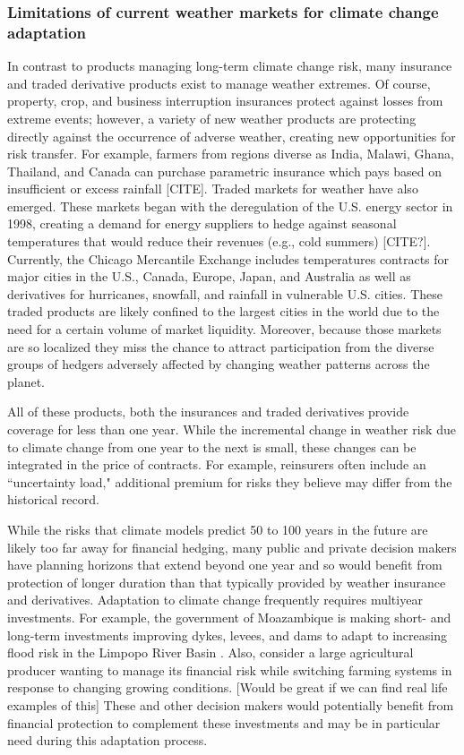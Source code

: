 \documentclass[authoryear]{article}
\begin{document}
\subsubsection{Limitations of current weather markets for climate change adaptation}
In contrast to products managing long-term climate change risk, many insurance and traded derivative products exist to manage weather extremes. Of course, property, crop, and business interruption insurances protect against losses from extreme events; however, a variety of new weather products are protecting directly against the occurrence of adverse weather, creating new opportunities for risk transfer. For example, farmers from regions diverse as India, Malawi, Ghana, Thailand, and Canada can purchase parametric insurance which pays based on insufficient or excess rainfall [CITE]. Traded markets for weather have also emerged. These markets began with the deregulation of the U.S. energy sector in 1998, creating a demand for energy suppliers to hedge against seasonal temperatures that would reduce their revenues (e.g., cold summers) [CITE?]. Currently, the Chicago Mercantile Exchange includes temperatures contracts for major cities in the U.S., Canada, Europe, Japan, and Australia as well as derivatives for hurricanes, snowfall, and rainfall in vulnerable U.S. cities. These traded products are likely confined to the largest cities in the world due to the need for a certain volume of market liquidity. Moreover, because those markets are so localized they miss the chance to attract participation from the diverse groups of hedgers adversely affected by changing weather patterns across the planet.

All of these products, both the insurances and traded derivatives provide coverage for less than one year. While the incremental change in weather risk due to climate change from one year to the next is small, these changes can be integrated in the price of contracts. For example, reinsurers often include an ``uncertainty load," additional premium for risks they believe may differ from the historical record.

While the risks that climate models predict 50 to 100 years in the future are likely too far away for financial hedging, many public and private decision makers have planning horizons that extend beyond one year and so would benefit from protection of longer duration than that typically provided by weather insurance and derivatives. Adaptation to climate change frequently requires multiyear investments. For example, the government of Moazambique is making short- and long-term investments improving dykes, levees, and dams to adapt to increasing flood risk in the Limpopo River Basin \citep{worldBank2013limpopo}. Also, consider a large agricultural producer wanting to manage its financial risk while switching farming systems in response to changing growing conditions. [Would be great if we can find real life examples of this] These and other decision makers would potentially benefit from financial protection to complement these investments and may be in particular need during this adaptation process.
\end{document}
